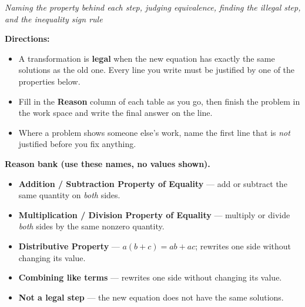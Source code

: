 \documentclass[12pt]{article}
\newlength{\reasoncol}
\begin{document}

\noindent\emph{Naming the property behind each step, judging equivalence, finding the illegal step, and the inequality sign rule}

\vspace{0.15cm}
\noindent\textbf{Directions:}
\begin{itemize}[leftmargin=0.9cm, itemsep=2pt, topsep=3pt]
  \item A transformation is \textbf{legal} when the new equation has exactly the
        same solutions as the old one. Every line you write must be justified by
        one of the properties below.
  \item Fill in the \textbf{Reason} column of each table as you go, then finish
        the problem in the work space and write the final answer on the line.
  \item Where a problem shows someone else's work, name the first line that is
        \emph{not} justified before you fix anything.
\end{itemize}

\vspace{0.1cm}
\noindent\textbf{Reason bank (use these names, no values shown).}
\begin{itemize}[leftmargin=0.9cm, itemsep=1pt, topsep=2pt]
  \item \textbf{Addition / Subtraction Property of Equality} --- add or subtract
        the same quantity on \emph{both} sides.
  \item \textbf{Multiplication / Division Property of Equality} --- multiply or
        divide \emph{both} sides by the same nonzero quantity.
  \item \textbf{Distributive Property} --- $a(b+c)=ab+ac$; rewrites one side
        without changing its value.
  \item \textbf{Combining like terms} --- rewrites one side without changing
        its value.
  \item \textbf{Not a legal step} --- the new equation does not have the same
        solutions.
\end{itemize}

\end{document}
